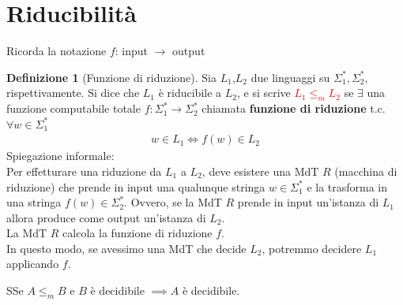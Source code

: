 \documentclass{article}  %
\theoremstyle{definition}
\newtheorem{definition}{Definizione}[section]
\begin{document}
\section{Riducibilità}
Ricorda la notazione $f$: input $\rightarrow$ output
\begin{definition}[Funzione di riduzione]
  Sia $L_1$,$L_2$ due linguaggi su $\Sigma_{1}^*,\Sigma_{2}^*,$ rispettivamente.
  Si dice che $L_1$ è riducibile a $L_2$, e si scrive \textcolor{red}{$L_1 \leq_{m} L_2$} se $\exists$ una funzione computabile totale
  $f:\Sigma^*_1 \rightarrow \Sigma^*_2$ chiamata \textbf{funzione di riduzione} t.c. $\forall{w}\in \Sigma^*_1$
  \begin{align*}
    w \in L_1 \iff f(w) \in L_2
  \end{align*}
  Spiegazione informale:\\
  Per effetturare una riduzione da $L_1$ a $L_2$, deve esistere una MdT $R$ (macchina di riduzione) che prende in input 
  una qualunque stringa $w \in \Sigma^*_1$ e la trasforma in una stringa $f(w) \in \Sigma^*_2$. 
  Ovvero, se la MdT $R$ prende in input un'istanza di $L_1$ allora produce come output un'istanza di $L_2$. \\
  La MdT $R$ calcola la funzione di riduzione $f$. \\
  In questo modo, se avessimo una MdT che decide $L_2$, potremmo decidere $L_1$ applicando $f$.
\end{definition} 
\begin{theorem}{3.1}
  SSe $A \leq_m B$ e $B$ è decidibile $\implies A$ è decidibile. 
\end{theorem}
\end{document}
